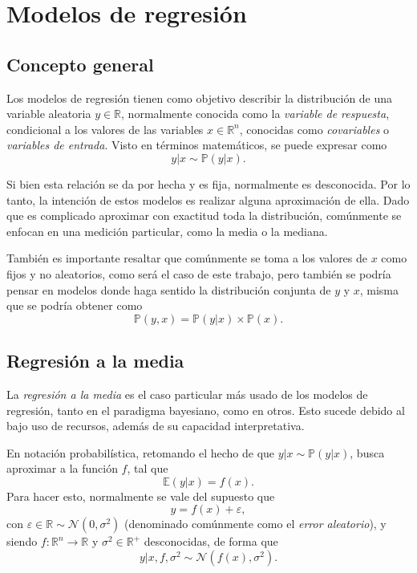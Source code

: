 \chapter[Modelos de regresi\'on]{Modelos de regresi\'on}

\section{Concepto general}

Los modelos de regresi\'on tienen como objetivo describir la distribuci\'on de una variable aleatoria $y \in \mathbb{R}$, normalmente conocida como la \textit{variable de respuesta}, condicional a los valores de las variables $x \in \mathbb{R}^n$, conocidas como \textit{covariables} o \textit{variables de entrada}. Visto en t\'erminos matem\'aticos, se puede expresar como
\begin{equation*}
    y|x \sim \mathbb{P}(y|x).
\end{equation*}

Si bien esta relaci\'on se da por hecha y es fija, normalmente es desconocida. Por lo tanto, la intenci\'on de estos modelos es realizar alguna aproximaci\'on de ella. Dado que es complicado aproximar con exactitud toda la distribuci\'on, com\'unmente se enfocan en una medici\'on particular, como la media o la mediana.

Tambi\'en es importante resaltar que com\'unmente se toma a los valores de $x$ como fijos y no aleatorios, como ser\'a el caso de este trabajo, pero tambi\'en se podr\'ia pensar en modelos donde haga sentido la distribuci\'on conjunta de $y$ y $x$, misma que se podr\'ia obtener como
\begin{equation*}
    \mathbb{P}(y,x) = \mathbb{P}(y|x) \times \mathbb{P}(x).
\end{equation*}

\section{Regresión a la media}

La \textit{regresi\'on a la media} es el caso particular m\'as usado de los modelos de regresi\'on, tanto en el paradigma bayesiano, como en otros. Esto sucede debido al bajo uso de recursos, adem\'as de su capacidad interpretativa.

En notaci\'on probabil\'istica, retomando el hecho de que $y|x \sim \mathbb{P}(y|x)$, busca aproximar a la funci\'on $f$, tal que 
\begin{equation*}
    \mathbb{E}(y|x) = f(x).
\end{equation*}
Para hacer esto, normalmente se vale del supuesto que
\begin{equation*}
    y = f(x) + \varepsilon,
\end{equation*}
con $\varepsilon \in \mathbb{R} \sim \mathcal{N}(0,\sigma^2)$ (denominado com\'unmente como el \textit{error aleatorio}), y siendo $f: \mathbb{R}^n \rightarrow \mathbb{R}$ y $\sigma^2 \in \mathbb{R^+}$ desconocidas, de forma que
\begin{equation*}
    y | x, f, \sigma^2 \sim \mathcal{N}(f(x),\sigma^2).
\end{equation*}

